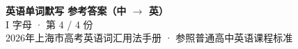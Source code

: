 \documentclass[10pt,a4paper]{article}
\begin{document}
\pagestyle{plain}

\begin{center}
{\LARGE\bfseries 英语单词默写 \quad 参考答案（中 $\to$ 英）}\\[0.22em]
{\large I 字母 · 第 4 / 4 份}\\[0.18em]
{\small 2026年上海市高考英语词汇用法手册 · 参照普通高中英语课程标准}
\end{center}

\vspace{0.2em}
\noindent{\color{rulegray}\rule{\textwidth}{0.8pt}}

\vspace{0.35em}

\vspace{0.25em}
\renewcommand{\arraystretch}{1.32}
\end{document}
